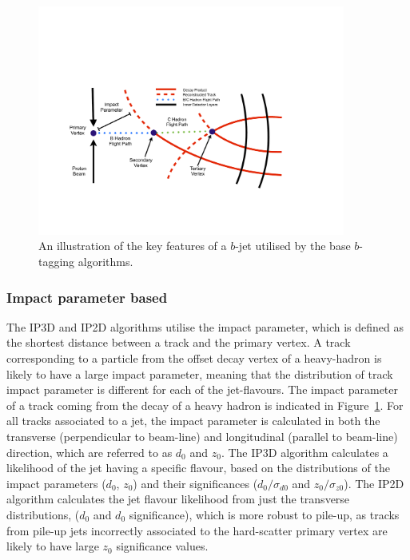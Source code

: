 \begin{figure}[!htb]
  \begin{center}
    \includegraphics[width=0.9\textwidth]{figs/Objects/bjets_schem.pdf}
    \caption{An illustration of the key features of a $b$-jet utilised by the base $b$-tagging algorithms.}
    \label{fig:obj_bjets_schem}
  \end{center}
  \vspace{-0.5cm}
\end{figure}

\subsubsection{Impact parameter based}
\label{sec:obj-bjets_IP}

The IP3D and IP2D algorithms utilise the impact parameter, which is defined as the shortest distance between a track and the primary vertex.
A track corresponding to a particle from the offset decay vertex of a heavy-hadron is likely to have a large impact parameter,
meaning that the distribution of track impact parameter is different for each of the jet-flavours.
The impact parameter of a track coming from the decay of a heavy hadron is indicated in Figure~\ref{fig:obj_bjets_schem}.
For all tracks associated to a jet, the impact parameter is calculated in both the transverse (perpendicular to beam-line)
and longitudinal (parallel to beam-line) direction, which are referred to as $d_{0}$ and $z_{0}$.
The IP3D algorithm calculates a likelihood of the jet having a specific flavour, 
based on the distributions of the impact parameters ($d_{0}$, $z_{0}$) and their significances 
($d_{0}/\sigma _{d0}$ and  $z_{0}/\sigma_{z0}$). 
The IP2D algorithm calculates the jet flavour likelihood from just the transverse distributions, ($d_{0}$ and $d_{0}$ significance), which is more
robust to pile-up, as tracks from pile-up jets incorrectly associated to the hard-scatter primary vertex are likely to have large $z_{0}$ significance values.

